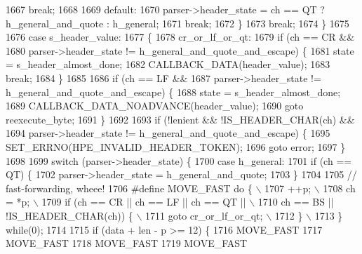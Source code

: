\begin{DoxyCode}
1667             \textcolor{keywordflow}{break};
1668 
1669           \textcolor{keywordflow}{default}:
1670             parser->header_state = ch == QT ? h_general_and_quote : h_general;
1671             \textcolor{keywordflow}{break};
1672         \}
1673         \textcolor{keywordflow}{break};
1674       \}
1675 
1676       \textcolor{keywordflow}{case} s_header_value:
1677       \{
1678         cr\_or\_lf\_or\_qt:
1679         \textcolor{keywordflow}{if} (ch == CR &&
1680             parser->header_state != h_general_and_quote_and_escape) \{
1681           state = s_header_almost_done;
1682           CALLBACK_DATA(header\_value);
1683           \textcolor{keywordflow}{break};
1684         \}
1685 
1686         \textcolor{keywordflow}{if} (ch == LF &&
1687             parser->header_state != h_general_and_quote_and_escape) \{
1688           state = s_header_almost_done;
1689           CALLBACK_DATA_NOADVANCE(header\_value);
1690           \textcolor{keywordflow}{goto} reexecute\_byte;
1691         \}
1692 
1693         \textcolor{keywordflow}{if} (!lenient && !IS_HEADER_CHAR(ch) &&
1694             parser->header_state != h_general_and_quote_and_escape) \{
1695           SET_ERRNO(HPE_INVALID_HEADER_TOKEN);
1696           \textcolor{keywordflow}{goto} error;
1697         \}
1698 
1699         \textcolor{keywordflow}{switch} (parser->header_state) \{
1700           \textcolor{keywordflow}{case} h_general:
1701             \textcolor{keywordflow}{if} (ch == QT) \{
1702               parser->header_state = h_general_and_quote;
1703             \}
1704 
1705             \textcolor{comment}{// fast-forwarding, wheee!}
1706 \textcolor{preprocessor}{            #define MOVE\_FAST do \{                    \(\backslash\)}
1707 \textcolor{preprocessor}{              ++p;                                    \(\backslash\)}
1708 \textcolor{preprocessor}{              ch = *p;                                \(\backslash\)}
1709 \textcolor{preprocessor}{              if (ch == CR || ch == LF || ch == QT || \(\backslash\)}
1710 \textcolor{preprocessor}{                  ch == BS || !IS\_HEADER\_CHAR(ch)) \{  \(\backslash\)}
1711 \textcolor{preprocessor}{                goto cr\_or\_lf\_or\_qt;                  \(\backslash\)}
1712 \textcolor{preprocessor}{              \}                                       \(\backslash\)}
1713 \textcolor{preprocessor}{            \} while(0);}
1714 
1715             \textcolor{keywordflow}{if} (data + len - p >= 12) \{
1716               MOVE_FAST
1717               MOVE_FAST
1718               MOVE_FAST
1719               MOVE_FAST

\end{DoxyCode}
